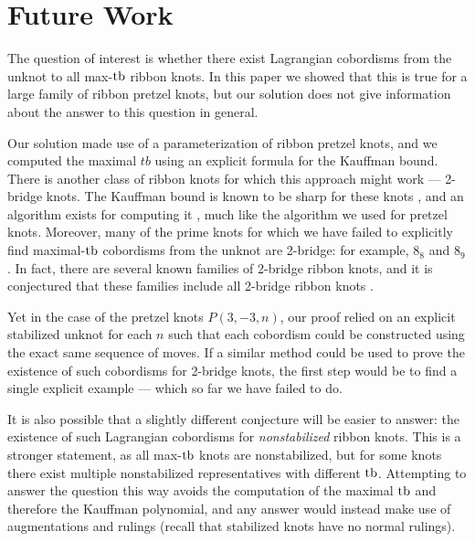 \chapter{Future Work}

The question of interest is whether there exist Lagrangian cobordisms from the unknot to all max-$\operatorname{tb}$ ribbon knots. In this paper we showed that this is true for a large family of ribbon pretzel knots, but our solution does not give information about the answer to this question in general. 

Our solution made use of a parameterization of ribbon pretzel knots, and we computed the maximal $tb$ using an explicit formula for the Kauffman bound. There is another class of ribbon knots for which this approach might work --- 2-bridge knots.
The Kauffman bound is known to be sharp for these knots \cite{ng}, and an algorithm exists for computing it \cite{luzhong-2bridge}, much like the algorithm we used for pretzel knots.
Moreover, many of the prime knots for which we have failed to explicitly find maximal-$\operatorname{tb}$ cobordisms from the unknot are 2-bridge: for example, $8_8$ and $8_9$. In fact, there are several known families of 2-bridge ribbon knots, and it is conjectured that these families include all 2-bridge ribbon knots \cite{lamm}.

Yet in the case of the pretzel knots $P(3, -3, n)$, our proof relied on an explicit stabilized unknot for each $n$ such that each cobordism could be constructed using the exact same sequence of moves.
If a similar method could be used to prove the existence of such cobordisms for 2-bridge knots, the first step would be to find a single explicit example --- which so far we have failed to do.

It is also possible that a slightly different conjecture will be easier to answer: the existence of such Lagrangian cobordisms for \emph{nonstabilized} ribbon knots. This is a stronger statement, as all max-$\operatorname{tb}$ knots are nonstabilized, but for some knots there exist multiple nonstabilized representatives with different $\operatorname{tb}$. Attempting to answer the question this way avoids the computation of the maximal $\operatorname{tb}$ and therefore the Kauffman polynomial, and any answer would instead make use of augmentations and rulings (recall that stabilized knots have no normal rulings).


